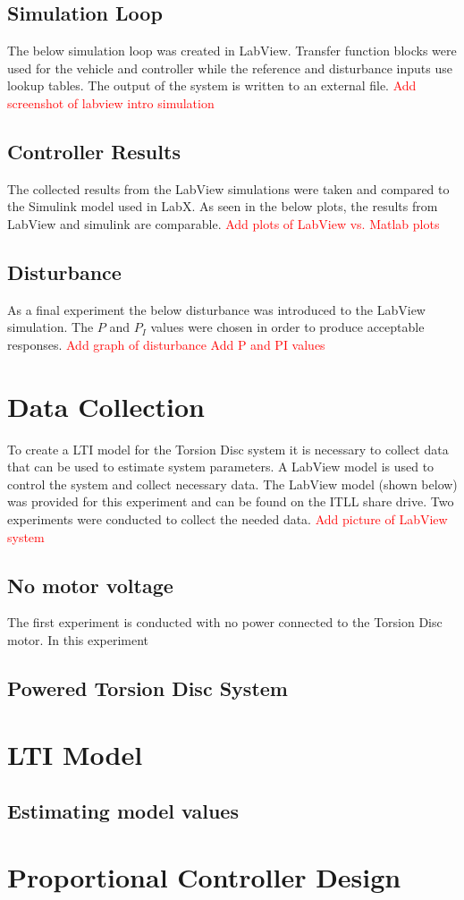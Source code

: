 \documentclass[11pt,titlepage]{article}
\begin{document}
	\subsection{Simulation Loop}
		The below simulation loop was created in LabView. Transfer function blocks were used for the vehicle and controller while the reference and disturbance inputs use lookup tables. The output of the system is written to an external file.
		\textcolor{red}{Add screenshot of labview intro simulation}
	\subsection{Controller Results}
		The collected results from the LabView simulations were taken and compared to the Simulink model used in LabX. As seen in the below plots, the results from LabView and simulink are comparable.
		\textcolor{red}{Add plots of LabView vs. Matlab plots}
	\subsection{Disturbance} 
		As a final experiment the below disturbance was introduced to the LabView simulation. The $P$ and $P_I$ values were chosen in order to produce acceptable responses.
		\textcolor{red}{Add graph of disturbance}
		\textcolor{red}{Add P and PI values}

\section{Data Collection}
	To create a LTI model for the Torsion Disc system it is necessary to collect data that can be used to estimate system parameters. A LabView model is used to control the system and collect necessary data. The LabView model (shown below) was provided for this experiment and can be found on the ITLL share drive. Two experiments were conducted to collect the needed data.
	\textcolor{red}{Add picture of LabView system}
	\subsection{No motor voltage}
		The first experiment is conducted with no power connected to the Torsion Disc motor. In this experiment 
	\subsection{Powered Torsion Disc System}

\section{LTI Model}
	\subsection{Estimating model values}

\section{Proportional Controller Design}
\end{document}
